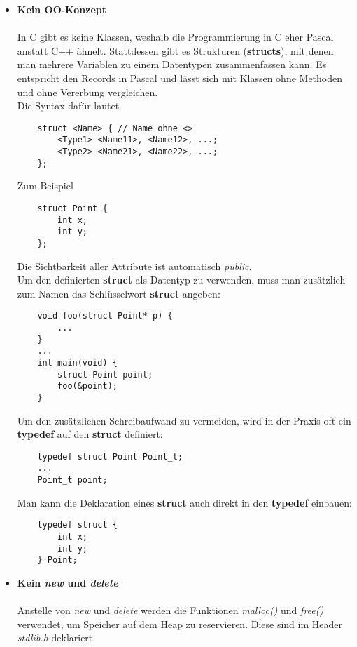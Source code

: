 \documentclass[
  accentcolor=tud1c,	%
  colorbacktitle,		%
  inverttitle,			%
  german,				%
  twoside
]{tudexercise}
\begin{document}
\begin{itemize}
\item[] \textbf{Kein OO-Konzept}\\\\
In C gibt es keine Klassen, weshalb die Programmierung in C eher Pascal anstatt C++ ähnelt. Stattdessen gibt es Strukturen (\textbf{structs}), mit denen man mehrere Variablen zu einem Datentypen zusammenfassen kann. Es entspricht den Records in Pascal und lässt sich mit Klassen ohne Methoden und ohne Vererbung vergleichen.\\

Die Syntax dafür lautet
\begin{lstlisting}
	struct <Name> { // Name ohne <>
		<Type1> <Name11>, <Name12>, ...;
		<Type2> <Name21>, <Name22>, ...;
	};
\end{lstlisting} 

Zum Beispiel
\begin{lstlisting}
	struct Point {
		int x;
		int y;
	};
\end{lstlisting}

Die Sichtbarkeit aller Attribute ist automatisch \emph{public}. \\

Um den definierten \textbf{struct} als Datentyp zu verwenden, muss man zusätzlich zum Namen das Schlüsselwort \textbf{struct} angeben:

\begin{lstlisting}
	void foo(struct Point* p) {
		...
	}
	...
	int main(void) {
		struct Point point;
		foo(&point);
	}
\end{lstlisting}

Um den zusätzlichen Schreibaufwand zu vermeiden, wird in der Praxis oft ein \textbf{typedef} auf den \textbf{struct} definiert:

\begin{lstlisting}
	typedef struct Point Point_t;
	...
	Point_t point;
\end{lstlisting}

Man kann die Deklaration eines \textbf{struct} auch direkt in den \textbf{typedef} einbauen:
\begin{lstlisting}
	typedef struct {
		int x;
		int y;	
	} Point;
\end{lstlisting}

\item[] \textbf{Kein \emph{new} und \emph{delete}}\\\\
Anstelle von \emph{new} und \emph{delete} werden die Funktionen \emph{malloc()} und \emph{free()} verwendet, um Speicher auf dem Heap zu reservieren. Diese sind im Header \emph{stdlib.h} deklariert.


\end{itemize}
\end{document}
